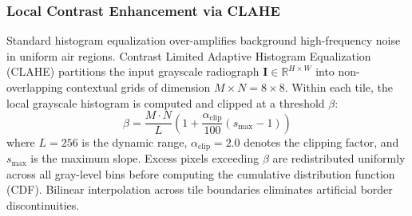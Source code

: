 \documentclass[journal]{IEEEtran}
\begin{document}
\subsubsection{Local Contrast Enhancement via CLAHE}
Standard histogram equalization over-amplifies background high-frequency noise in uniform air regions. Contrast Limited Adaptive Histogram Equalization (CLAHE) partitions the input grayscale radiograph $\mathbf{I} \in \mathbb{R}^{H \times W}$ into non-overlapping contextual grids of dimension $M \times N = 8 \times 8$. Within each tile, the local grayscale histogram is computed and clipped at a threshold $\beta$:
\begin{equation}
\beta = \frac{M \cdot N}{L} \left(1 + \frac{\alpha_{\text{clip}}}{100}(s_{\max} - 1)\right)
\label{eq:clahe_clip}
\end{equation}
where $L=256$ is the dynamic range, $\alpha_{\text{clip}} = 2.0$ denotes the clipping factor, and $s_{\max}$ is the maximum slope. Excess pixels exceeding $\beta$ are redistributed uniformly across all gray-level bins before computing the cumulative distribution function (CDF). Bilinear interpolation across tile boundaries eliminates artificial border discontinuities.
\end{document}
